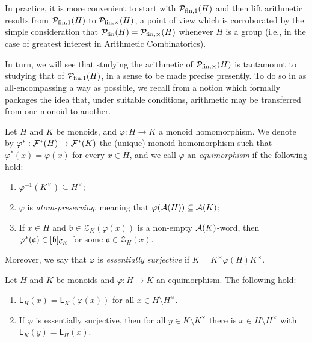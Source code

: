 In practice, it is more convenient to start with $\mathcal{P}_{\textrm{fin}, 1}(H)$ and then lift arithmetic results from $\mathcal{P}_{\textrm{fin}, 1}(H)$ to $\mathcal{P}_{\textrm{fin}, \times}(H)$, a point of view which is corroborated by the simple consideration that $\mathcal{P}_{\textrm{fin}}(H) = \mathcal{P}_{\textrm{fin}, \times}(H)$ whenever $H$ is a group (i.e., in the case of greatest interest in Arithmetic Combinatorics).

In turn, we will see that studying the arithmetic of $\mathcal{P}_{\textrm{fin}, \times}(H)$ is tantamount to studying that of $\mathcal{P}_{\textrm{fin}, 1}(H)$, in a sense to be made precise presently.
To do so in as all-encompassing a way as possible, we recall from \cite[Definition 3.2]{tringali18} a notion which formally packages the idea that, under suitable conditions, arithmetic may be transferred from one monoid to another.
%
\begin{defn}\label{def:equimorphism}
Let $H$ and $K$ be monoids, and $\varphi: H\to K$ a monoid homomorphism. We denote by $\varphi^*: \mathcal{F}^*(H)\to\mathcal{F}^*(K)$ the (unique) monoid homomorphism such that $\varphi^\ast(x) = \varphi(x)$ for every $x \in H$, and we call $\varphi$ an \emph{equimorphism} if the following hold:
\begin{enumerate}[label={({\small{E}}\arabic{*})}]
\item\label{def:equimorphism(E1)} $\varphi^{-1}(K^\times)\subseteq H^\times$;
\item\label{def:equimorphism(E2)} $\varphi$ is \emph{atom-preserving}, meaning that $\varphi(\mathcal{A}(H)) \subseteq \mathcal{A}(K)$;
\item\label{def:equimorphism(E3)} If $x\in H$ and $\mathfrak{b}\in \mathcal{Z}_K(\varphi(x))$ is a non-empty $\mathcal{A}(K)$-word, then $\varphi^*(\mathfrak{a}) \in [ \mathfrak{b} ]_{\mathcal{C}_K}$ for some $\mathfrak{a}\in \mathcal{Z}_H(x)$.
\end{enumerate}
Moreover, we say that $\varphi$ is \emph{essentially surjective} if $K = K^\times \varphi(H)K^\times$.
\end{defn}
%
\begin{prop}\label{prop:equimorphism}
Let $H$ and $K$ be monoids and $\varphi:H\to K$ an equimorphism. The following hold:
\begin{enumerate}[label={\rm (\roman{*})}]
\item\label{it:prop:equimorphism(i)} $\mathsf{L}_H(x) = \mathsf{L}_K(\varphi(x))$ for all $x\in H\setminus H^\times$.
\item\label{it:prop:equimorphism(ii)} If $\varphi$ is essentially surjective, then for all $y\in K\setminus K^\times$ there is $x\in H\setminus H^\times$ with $\mathsf{L}_K(y) = \mathsf{L}_H(x)$.
\end{enumerate}
\end{prop}
